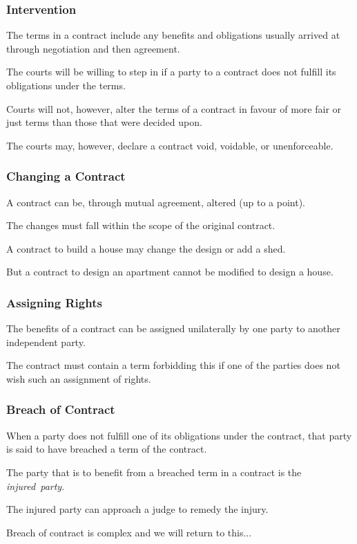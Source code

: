 \begin{frame}
\frametitle{Intervention}

The terms in a contract include any benefits and obligations usually arrived at through negotiation and then agreement.

The courts will be willing to step in if a party to a contract does not fulfill its obligations under the terms.

Courts will not, however, alter the terms of a contract in favour of more fair or just terms than those that were decided upon.

The courts may, however, declare a contract void, voidable, or unenforceable.


\end{frame}



\begin{frame}
\frametitle{Changing a Contract}

A contract can be, through mutual agreement, altered (up to a point).

The changes must fall within the scope of the original contract.

A contract to build a house may change the design or add a shed.

But a contract to design an apartment cannot be modified to design a house.

\end{frame}



\begin{frame}
\frametitle{Assigning Rights}

The benefits of a contract can be assigned unilaterally by one party to another independent party.

The contract must contain a term forbidding this if one of the parties does not wish such an assignment of rights.

\end{frame}



\begin{frame}
\frametitle{Breach of Contract}

When a party does not fulfill one of its obligations under the contract, that party is said to have breached a term of the contract.

The party that is to benefit from a breached term in a contract is the \textit{injured~party}.

The injured party can approach a judge to remedy the injury.

Breach of contract is complex and we will return to this...

\end{frame}

